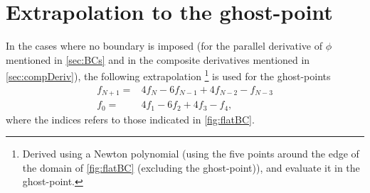 \section{Extrapolation to the ghost-point}
\label{sec:extrapolGhost}
%
In the cases where no boundary is imposed (for the parallel derivative of $\phi$ mentioned in \cref{sec:BCs} and in the composite derivatives mentioned in \cref{sec:compDeriv}), the following extrapolation %
%
\footnote{
Derived using a Newton polynomial (using the five points around the edge of the domain of \cref{fig:flatBC} (excluding the ghost-point)), and evaluate it in the ghost-point.
}%
is used for the ghost-points
%
\begin{align}
    f_{N+1} =& 4f_{N} - 6f_{N-1} + 4f_{N-2} - f_{N-3}
    \label{eq:extraPolUp}
    \\
    f_{0} =& 4f_{1} - 6f_{2} + 4f_{3} - f_{4},
    \label{eq:extraPolDown}
\end{align}
%
where the indices refers to those indicated in \cref{fig:flatBC}.
